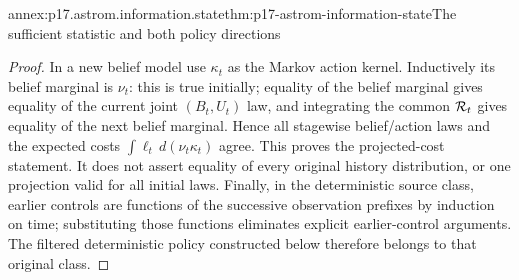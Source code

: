 \begin{annexitem}{annex:p17.astrom.information.state}{thm:p17-astrom-information-state}{The sufficient statistic and both policy directions}
\begin{proof}
In a new belief model use \(\kappa_t\) as the Markov
action kernel. Inductively its belief marginal is
\(\nu_t\): this is true initially; equality of the
belief marginal gives equality of the current joint
\((B_t,U_t)\) law, and integrating the common
\({\cal R}_t\) gives equality of the next belief marginal.
Hence all stagewise belief/action laws and the expected
costs \(\int\ell_t\,d(\nu_t\kappa_t)\) agree.
This proves the projected-cost statement. It does not
assert equality of every original history distribution,
or one projection valid for all initial laws.
Finally, in the deterministic source class, earlier
controls are functions of the successive observation
prefixes by induction on time; substituting those functions
eliminates explicit earlier-control arguments. The filtered
deterministic policy constructed below therefore belongs
to that original class.
\end{proof}
\end{annexitem}

